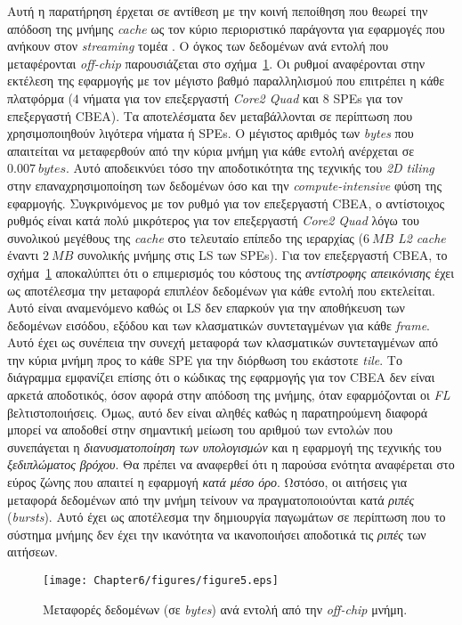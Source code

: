 Αυτή η παρατήρηση έρχεται σε αντίθεση με την κοινή πεποίθηση που θεωρεί την απόδοση της μνήμης \textsl{cache} ως τον κύριο περιοριστικό παράγοντα για εφαρμογές που ανήκουν στον \textsl{streaming} τομέα \cite{dynamiccache}. Ο όγκος των δεδομένων ανά εντολή που μεταφέρονται \textsl{off-chip} παρουσιάζεται στο σχήμα~\ref{figure:fig65}. Οι ρυθμοί αναφέρονται στην εκτέλεση της εφαρμογής με τον μέγιστο βαθμό παραλληλισμού που επιτρέπει η κάθε πλατφόρμα (\(4\) νήματα για τον επεξεργαστή \textsl{Core2 Quad} και \(8\) \acp{SPE} για τον επεξεργαστή \ac{CBEA}). Τα αποτελέσματα δεν μεταβάλλονται σε περίπτωση που χρησιμοποιηθούν λιγότερα νήματα ή \acp{SPE}.\newline \indent
Ο μέγιστος αριθμός των \textsl{bytes} που απαιτείται να μεταφερθούν από την κύρια μνήμη για κάθε εντολή ανέρχεται σε \(0.007\ bytes\). Αυτό αποδεικνύει τόσο την αποδοτικότητα της τεχνικής του \textsl{2D tiling} στην επαναχρησιμοποίηση των δεδομένων όσο και την \textsl{compute-intensive} φύση της εφαρμογής.\newline \indent
Συγκρινόμενος με τον ρυθμό για τον επεξεργαστή \ac{CBEA}, ο αντίστοιχος ρυθμός είναι κατά πολύ μικρότερος για τον επεξεργαστή \textsl{Core2 Quad} λόγω του συνολικού μεγέθους της \textsl{cache} στο τελευταίο επίπεδο της ιεραρχίας (\(6\ MB\) \textsl{L2 cache} έναντι \(2\ MB\) συνολικής μνήμης στις \ac{LS} των \acp{SPE}).\newline \indent
Για τον επεξεργαστή \ac{CBEA}, το σχήμα~\ref{figure:fig65} αποκαλύπτει ότι ο επιμερισμός του κόστους της \textsl{αντίστροφης απεικόνισης} έχει ως αποτέλεσμα την μεταφορά επιπλέον δεδομένων για κάθε εντολή που εκτελείται. Αυτό είναι αναμενόμενο καθώς οι \ac{LS} δεν επαρκούν για την αποθήκευση των δεδομένων εισόδου, εξόδου και των κλασματικών συντεταγμένων για κάθε \textsl{frame}. Αυτό έχει ως συνέπεια την συνεχή μεταφορά των κλασματικών συντεταγμένων από την κύρια μνήμη προς το κάθε \ac{SPE} για την διόρθωση του εκάστοτε \textsl{tile}. Το διάγραμμα εμφανίζει επίσης ότι ο κώδικας της εφαρμογής για τον \ac{CBEA} δεν είναι αρκετά αποδοτικός, όσον αφορά στην απόδοση της μνήμης, όταν εφαρμόζονται οι \textsl{FL} βελτιστοποιήσεις. Όμως, αυτό δεν είναι αληθές καθώς η παρατηρούμενη διαφορά μπορεί να αποδοθεί στην σημαντική μείωση του αριθμού των εντολών που συνεπάγεται η \textsl{διανυσματοποίηση των υπολογισμών} και η εφαρμογή της τεχνικής του \textsl{ξεδιπλώματος βρόχου}.\newline \indent
Θα πρέπει να αναφερθεί ότι η παρούσα ενότητα αναφέρεται στο εύρος ζώνης που απαιτεί η εφαρμογή \textsl{κατά μέσο όρο}. Ωστόσο, οι αιτήσεις για μεταφορά δεδομένων από την μνήμη τείνουν να πραγματοποιούνται κατά \textsl{ριπές} (\textsl{bursts}). Αυτό έχει ως αποτέλεσμα την δημιουργία παγωμάτων σε περίπτωση που το σύστημα μνήμης δεν έχει την ικανότητα να ικανοποιήσει αποδοτικά τις \textsl{ριπές} των αιτήσεων.
\begin{figure}
\centering
\texttt{[image: Chapter6/figures/figure5.eps]}
\caption{Μεταφορές δεδομένων (σε \textsl{bytes}) ανά εντολή από την \textsl{off-chip} μνήμη.}
\label{figure:fig65}
\end{figure}

